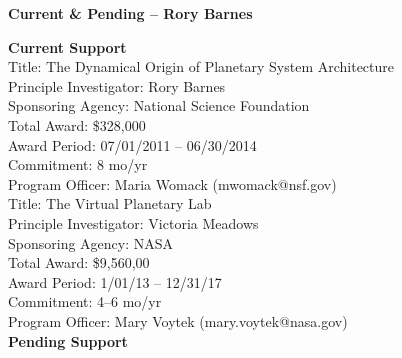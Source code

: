 \documentclass[12pt]{article}
\begin{document}
\begin{center}\Large{\bf Current \& Pending -- Rory Barnes}\end{center}

\noindent\textbf{Current Support}\\

\noindent Title: The Dynamical Origin of Planetary System Architecture\\
Principle Investigator: Rory Barnes\\
Sponsoring Agency: National Science Foundation\\
Total Award: \$328,000\\
Award Period: 07/01/2011 -- 06/30/2014\\
Commitment: 8 mo/yr\\
Program Officer: Maria Womack (mwomack@nsf.gov)\\

\noindent Title: The Virtual Planetary Lab\\
Principle Investigator: Victoria Meadows\\
Sponsoring Agency: NASA\\
Total Award: \$9,560,00\\
Award Period: 1/01/13 -- 12/31/17\\
Commitment: 4--6 mo/yr\\
Program Officer: Mary Voytek (mary.voytek@nasa.gov)\\

\noindent \textbf{Pending Support}\\
\end{document}
